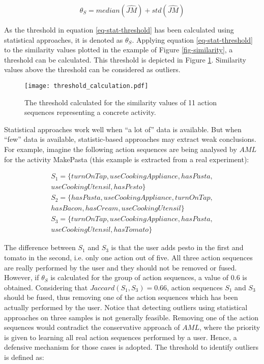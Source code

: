 \begin{equation}
\label{eq-stat-threshold}
 \theta_S = median(\hat{JM}) + std(\hat{JM})
\end{equation}

As the threshold in equation \ref{eq-stat-threshold} has been calculated using statistical approaches, it is denoted as $\theta_S$. Applying equation \ref{eq-stat-threshold} to the similarity values plotted in the example of Figure \ref{fig-similarity}, a threshold can be calculated. This threshold is depicted in Figure \ref{fig-threshold-calc}. Similarity values above the threshold can be considered as outliers. 

\begin{figure}[htbp]
\centering
\texttt{[image: threshold\_calculation.pdf]}
    \caption{The threshold calculated for the similarity values of 11 action sequences representing a concrete activity.}
    \label{fig-threshold-calc}
\end{figure}

Statistical approaches work well when ``a lot of'' data is available. But when ``few'' data is available, statistic-based approaches may extract weak conclusions. For example, imagine the following action sequences are being analysed by $AML$ for the activity MakePasta (this example is extracted from a real experiment):

\begin{equation*}
 \begin{split}
  S_1 = \{ turnOnTap, useCookingAppliance, hasPasta,\\ useCookingUtensil, hasPesto \} \\
  S_2 = \{ hasPasta, useCookingAppliance, turnOnTap,\\ hasBacon, hasCream, useCookingUtensil \} \\
  S_3 = \{ turnOnTap, useCookingAppliance, hasPasta,\\ useCookingUtensil, hasTomato \}
 \end{split}
\end{equation*}

The difference between $S_1$ and $S_3$ is that the user adds pesto in the first and tomato in the second, i.e. only one action out of five. All three action sequences are really performed by the user and they should not be removed or fused. However, if $\theta_S$ is calculated for the group of action sequences, a value of 0.6 is obtained. Considering that $Jaccard(S_1, S_3) = 0.66$, action sequences $S_1$ and $S_3$ should be fused, thus removing one of the action sequences which has been actually performed by the user. Notice that detecting outliers using statistical approaches on three samples is not generally feasible. Removing one of the action sequences would contradict the conservative approach of $AML$, where the priority is given to learning all real action sequences performed by a user. Hence, a defensive mechanism for those cases is adopted. The threshold to identify outliers is defined as:

